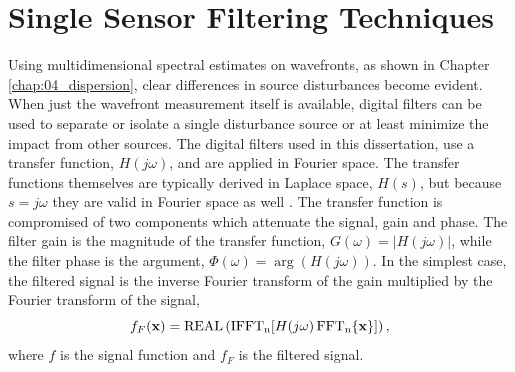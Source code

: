 
\chapter{Single Sensor Filtering Techniques}
\label{chap:06_single_filter}

Using multidimensional spectral estimates on wavefronts, as shown in Chapter \ref{chap:04_dispersion}, clear differences in source disturbances become evident.
When just the wavefront measurement itself is available, digital filters can be used to separate or isolate a single disturbance source or at least minimize the impact from other sources.
The digital filters used in this dissertation, use a transfer function, $H(j\omega)$, and are applied in Fourier space.
The transfer functions themselves are typically derived in Laplace space, $H(s)$, but because $s=j\omega$ they are valid in Fourier space as well \cite{Hamming-1998-CdhcDuvZ}.
The transfer function is compromised of two components which attenuate the signal, gain and phase.
The filter gain is the magnitude of the transfer function, $G(\omega) = |H(j\omega)|$, while the filter phase is the argument, $\Phi(\omega) = \arg(H(j\omega))$.
In the simplest case, the filtered signal is the inverse Fourier transform of the gain multiplied by the Fourier transform of the signal,
\begin{equation}
 f_F(\mathbf{x}) = \operatorname{REAL}\left(\operatorname{IFFT_n}[H(j\mathbf{\omega})\operatorname{FFT_n}\{\mathbf{x}\}]\right) \textrm{,}
 \label{eqn:06_filter_function}
\end{equation}
where $f$ is the signal function and $f_F$ is the filtered signal.




